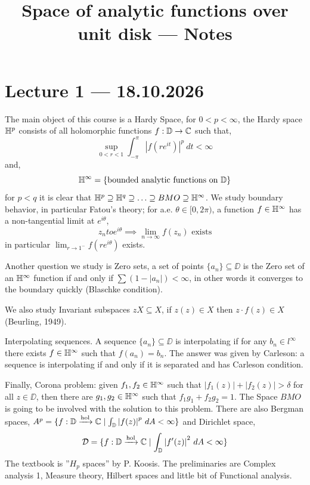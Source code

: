 
\title{Space of analytic functions over unit disk --- Notes}
\setcounter{secnumdepth}{2}

\usepackage{fancyhdr}
\pagestyle{fancy}
\renewcommand{\headrulewidth}{0pt}

\DeclareMathOperator\length{length}


\maketitle
\maketitleprint[blue]{}

\tableofcontents

\section{Lecture 1 --- 18.10.2026}
The main object of this course is a Hardy Space, for $0 < p < \infty$, the Hardy space $\mathbb{H}^p$ consists of all holomorphic functions $f : \mathbb{D} \to \mathbb{C}$ such that,
\[
	\sup_{0 < r < 1} \int_{- \pi}^{\pi} {| f(r e^{i t}) |}^p\ dt < \infty
\]
and,
\[
	\mathbb{H}^\infty
	= \{ \text{bounded analytic functions on } \mathbb{D} \}
\]
for $p < q$ it is clear that $\mathbb{H}^p \supseteq \mathbb{H}^q \supseteq \ldots \supseteq BMO \supseteq \mathbb{H}^\infty$.
We study boundary behavior, in particular Fatou's theory; for a.e. $\theta \in [0, 2 \pi)$, a function $f \in \mathbb{H}^\infty$ has a non-tangential limit at $e^{i \theta}$,
\[
	z_n to e^{i \theta}
	\implies \lim_{n \to \infty} f(z_n) \text{ exists}
\]
in particular $\lim_{r \to 1^-} f(r e^{i \theta})$ exists.

Another question we study is Zero sets, a set of points $\{ a_n \} \subseteq \DD$ is the Zero set of an $\mathbb{H}^\infty$ function if and only if $\sum (1 - | a_n |) < \infty$,
in other words it converges to the boundary quickly (Blaschke condition).

We also study Invariant subspaces $z X \subseteq X$, if $z(z) \in X$ then $z \cdot f(z) \in X$ (Beurling, 1949).

Interpolating sequences. A sequence $\{ a_n \} \subseteq \DD$ is interpolating if for any $b_n \in l^\infty$ there exists $f \in \mathbb{H}^\infty$ such that $f(a_n) = b_n$.
The answer was given by Carleson: a sequence is interpolating if and only if it is separated and has Carleson condition.

Finally, Corona problem: given $f_1, f_2 \in \mathbb{H}^\infty$ such that $|f_1(z)| + |f_2(z)| > \delta$ for all $z \in \DD$, then there are $g_1, g_2 \in \mathbb{H}^\infty$ such that $f_1 g_1 + f_2 g_2 = 1$.
The Space $BMO$ is going to be involved with the solution to this problem.
There are also Bergman spaces, $A^p = \{ f : \mathbb{D} \xrightarrow{\text{hol}} \mathbb{C} \mid \int_{\mathbb{D}} {| f(z) |}^p\ dA < \infty \}$ and Dirichlet space,
\[
	\mathcal{D}
	= \{ f : \mathbb{D} \xrightarrow{\text{hol}} \mathbb{C} \mid \int_{\mathbb{D}} {| f'(z) |}^2\ dA < \infty \}
\]
The textbook is ''$H_p$ spaces'' by P. Koosis. The preliminaries are Complex analysis 1, Measure theory, Hilbert spaces and little bit of Functional analysis.

